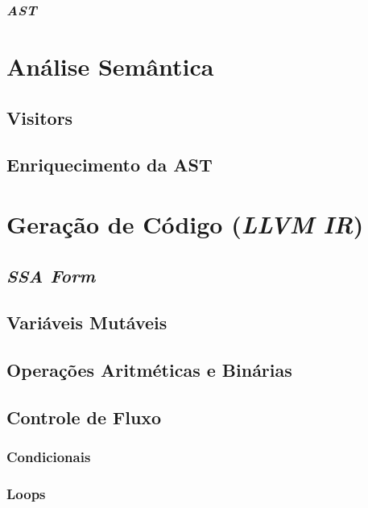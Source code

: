 \documentclass[11pt, oneside, titlepage]{report}
\begin{document}
          \subsubsection{\textit{AST}}

      \section{Análise Semântica}

        \subsection{Visitors}

        \subsection{Enriquecimento da AST}

      \section{Geração de Código \small(\textit{LLVM IR})}

        \subsection{\textit{SSA Form}}

        \subsection{Variáveis Mutáveis}

        \subsection{Operações Aritméticas e Binárias}

        \subsection{Controle de Fluxo}

          \subsubsection{Condicionais}

          \subsubsection{Loops}
\end{document}
